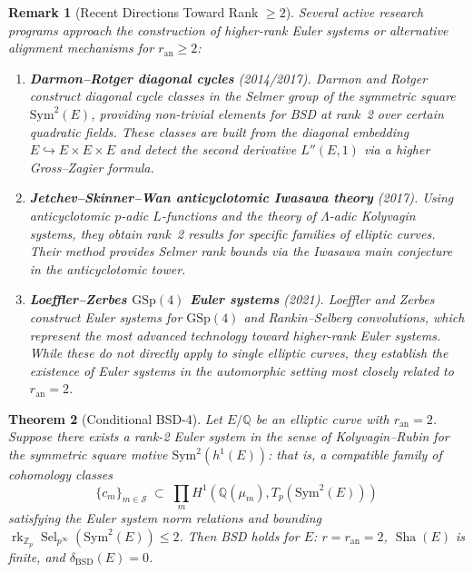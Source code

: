 \documentclass[11pt]{article}
\newtheorem{theorem}{Theorem}[section]
\newtheorem{remark}[theorem]{Remark}
\DeclareMathOperator{\rk}{rk}
\DeclareMathOperator{\Sha}{Sha}
\DeclareMathOperator{\Sel}{Sel}
\begin{document}
\begin{remark}[Recent Directions Toward Rank $\geq 2$]
\label{rem:rank2-progress}
Several active research programs approach the construction of higher-rank
Euler systems or alternative alignment mechanisms for $r_{\mathrm{an}} \geq 2$:

\begin{enumerate}
  \item \textbf{Darmon--Rotger diagonal cycles} \cite{DR} (2014/2017).
    Darmon and Rotger construct diagonal cycle classes in the Selmer group of
    the symmetric square $\mathrm{Sym}^2(E)$, providing non-trivial elements
    for BSD at rank~2 over certain quadratic fields.  These classes are built
    from the diagonal embedding $E \hookrightarrow E \times E \times E$ and
    detect the second derivative $L''(E,1)$ via a higher Gross--Zagier formula.

  \item \textbf{Jetchev--Skinner--Wan anticyclotomic Iwasawa theory}
    \cite{JSW} (2017).  Using anticyclotomic $p$-adic $L$-functions and the
    theory of $\Lambda$-adic Kolyvagin systems, they obtain rank~2 results for
    specific families of elliptic curves.  Their method provides Selmer rank
    bounds via the Iwasawa main conjecture in the anticyclotomic tower.

  \item \textbf{Loeffler--Zerbes $\mathrm{GSp}(4)$ Euler systems} \cite{LZ}
    (2021).  Loeffler and Zerbes construct Euler systems for
    $\mathrm{GSp}(4)$ and Rankin--Selberg convolutions, which represent the
    most advanced technology toward higher-rank Euler systems.  While these do
    not directly apply to single elliptic curves, they establish the existence
    of Euler systems in the automorphic setting most closely related to
    $r_{\mathrm{an}} = 2$.
\end{enumerate}
\end{remark}

\begin{theorem}[Conditional BSD-4]
\label{thm:conditional-bsd4}
Let $E/\mathbb{Q}$ be an elliptic curve with $r_{\mathrm{an}} = 2$.  Suppose
there exists a rank-2 Euler system in the sense of Kolyvagin--Rubin for the
symmetric square motive $\mathrm{Sym}^2(h^1(E))$: that is, a compatible
family of cohomology classes
\[
  \{c_m\}_{m \in \mathcal{S}} \;\subset\;
  \prod_{m} H^1(\mathbb{Q}(\mu_m), T_p(\mathrm{Sym}^2(E)))
\]
satisfying the Euler system norm relations and bounding
$\rk_{\mathbb{Z}_p} \Sel_{p^\infty}(\mathrm{Sym}^2(E)) \leq 2$.  Then BSD
holds for $E$: $r = r_{\mathrm{an}} = 2$, $\Sha(E)$ is finite, and
$\delta_{\mathrm{BSD}}(E) = 0$.
\end{theorem}
\end{document}
